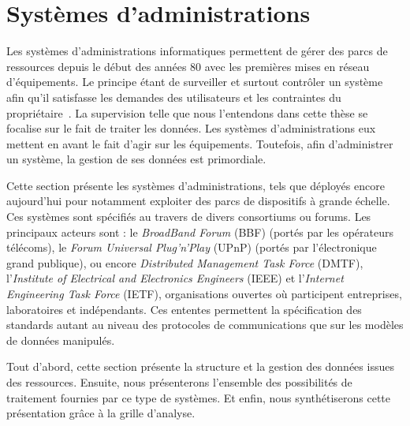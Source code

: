 \section{Systèmes d'administrations}\label{sec:rw:supervision:administration}
Les systèmes d'administrations informatiques permettent de gérer des parcs de ressources depuis le début des années 80 avec les premières mises en réseau d'équipements. Le principe étant de surveiller et surtout contrôler un système afin qu'il satisfasse les demandes des utilisateurs et les contraintes du propriétaire~\cite{Sloman:management}. La supervision telle que nous l'entendons dans cette thèse se focalise sur le fait de traiter les données. Les systèmes d'administrations eux mettent en avant le fait d'agir sur les équipements. Toutefois, afin d'administrer un système, la gestion de ses données est primordiale.

Cette section présente les systèmes d'administrations, tels que déployés encore aujourd'hui pour notamment exploiter des parcs de dispositifs à grande échelle. Ces systèmes sont spécifiés au travers de divers consortiums ou forums. Les principaux acteurs sont : le \textit{BroadBand Forum} (BBF) (portés par les opérateurs télécoms), le \textit{Forum Universal Plug'n'Play} (UPnP) (portés par l'électronique grand publique), ou encore \textit{Distributed Management Task Force} (DMTF), l'\textit{Institute of Electrical and Electronics Engineers} (IEEE) et l'\textit{Internet Engineering Task Force} (IETF), organisations ouvertes où participent entreprises, laboratoires et indépendants. Ces ententes permettent la spécification des standards autant au niveau des protocoles de communications que sur les modèles de données manipulés.

Tout d'abord, cette section présente la structure et la gestion des données issues des ressources. Ensuite, nous présenterons l'ensemble des possibilités de traitement fournies par ce type de systèmes. Et enfin, nous synthétiserons cette présentation grâce à la grille d'analyse.
